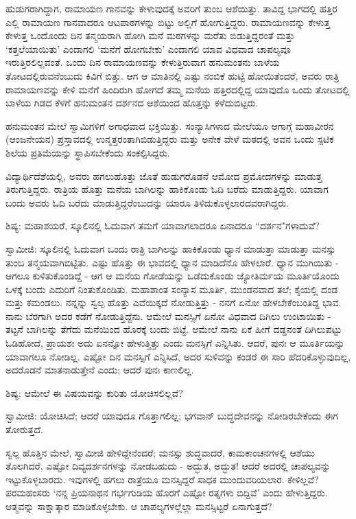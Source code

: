 ಹುಡುಗರಾಗಿದ್ದಾಗ, ರಾಮಾಯಣ ಗಾನವನ್ನು ಕೇಳುವುದಕ್ಕೆ ಅವರಿಗೆ ತುಂಬ ಆಶೆಯಿತ್ತು. ತಾವಿದ್ದ ಭಾಗದಲ್ಲಿ ಹತ್ತಿರ ಎಲ್ಲಿ ರಾಮಾಯಣ ಗಾನವಾದರೂ ಆಟಪಾಠಗಳನ್ನು ಬಿಟ್ಟು ಅಲ್ಲಿಗೆ ಹೋಗುತ್ತಿದ್ದರು. ರಾಮಾಯಣವನ್ನು ಕೇಳುತ್ತ ಕೇಳುತ್ತ ಒಂದೊಂದು ದಿನ ತನ್ಮಯರಾಗಿ ಹೋಗಿ ಮನೆ ಮಠಗಳನ್ನು ಮರೆತು ಬಿಡುತ್ತಿದ್ದರಂತೆ ಮತ್ತು ‘ಕತ್ತಲೆಯಾಯಿತು’ ಎಂದಾಗಲಿ ‘ಮನೆಗೆ ಹೋಗಬೇಕು’ ಎಂದಾಗಲಿ ಯಾವ ವಿಧವಾದ ಚಾಪಲ್ಯವೂ ಇರುತ್ತಿರಲಿಲ್ಲವಂತೆ. ಒಂದು ದಿನ ರಾಮಾಯಣವನ್ನು ಕೇಳುತ್ತಿರುವಾಗ ಹನುಮಂತನು ಬಾಳೆಯ ತೋಟದಲ್ಲಿರುವನೆಂಬುದು ಕಿವಿಗೆ ಬಿತ್ತು. ಆಗ ಆ ಮಾತಿನಲ್ಲಿ ಎಷ್ಟು ನಂಬಿಕೆ ಹುಟ್ಟಿ ಹೋಯಿತೆಂದರೆ, ಅವರು ರಾತ್ರಿ ರಾಮಾಯಣವನ್ನು ಕೇಳಿ ಮನೆಗೆ ಹಿಂದಿರುಗಿ ಹೋಗದೆ ತಮ್ಮ ಮನೆಯ ಹತ್ತಿರದಲ್ಲಿದ್ದ ಯಾವುದೊ ಒಂದು ತೋಟದಲ್ಲಿ ಬಾಳೆಯ ಗಿಡದ ಕೆಳಗೆ ಹನುಮಂತನ ದರ್ಶನದ ಆಶೆಯಿಂದ ಹೊತ್ತನ್ನು ಕಳೆದುಬಿಟ್ಟರು.

ಹನುಮಂತನ ಮೇಲೆ ಸ್ವಾಮಿಗಳಿಗೆ ಅಗಾಧವಾದ ಭಕ್ತಿಯಿತ್ತು. ಸಂನ್ಯಾಸಿಗಳಾದ ಮೇಲೆಯೂ ಆಗಾಗ್ಗೆ ಮಹಾವೀರನ (ಆಂಜನೇಯನ) ಪ್ರಸ್ತಾವದಲ್ಲಿ ಉನ್ಮತ್ತರಂತಾಗಿಬಿಡುತ್ತಿದ್ದರು ಮತ್ತು ಅನೇಕ ವೇಳೆ ಮಠದಲ್ಲಿ ಅವನ ಒಂದು ಸ್ಪಟಿಕ ಶಿಲೆಯ ಪ್ರತಿಮೆಯನ್ನು ಸ್ಥಾಪಿಸಬೇಕೆಂದು ಸಂಕಲ್ಪಿಸಿದ್ದರು.

ವಿದ್ಯಾರ್ಥಿದೆಶೆಯಲ್ಲಿ, ಅವರು ಹಗಲುಹೊತ್ತು ಜೊತೆ ಹುಡುಗರೊಡನೆ ಆಮೋದ ಪ್ರಮೋದಗಳನ್ನು ಮಾಡುತ್ತ ತಿರುಗುತ್ತಿದ್ದರು. ರಾತ್ರಿಯ ಹೊತ್ತು ಮನೆಯ ಬಾಗಿಲನ್ನು ಹಾಕಿಕೊಂಡು ಓದಿ ಬರೆದು ಮಾಡುತ್ತಿದ್ದರು. ಯಾವಾಗ ಬಂದು ಅವರು ಓದಿ ಬರೆದು ಮಾಡುತ್ತಿದ್ದರೆಂಬುದನ್ನು ಯಾರೂ ತಿಳಿದುಕೊಳ್ಳಲಾರದವರಾಗಿದ್ದರು.

\delimiter

ಶಿಷ್ಯ: ಮಹಾಶಯರೆ, ಸ್ಕೂಲಿನಲ್ಲಿ ಓದುವಾಗ ತಮಗೆ ಯಾವಾಗಲಾದರೂ ಏನಾದರೂ “ದರ್ಶನ"ಗಳಾದುವೆ?

ಸ್ವಾಮೀಜಿ: ಸ್ಕೂಲಿನಲ್ಲಿ ಓದುವಾಗ ಒಂದು ರಾತ್ರಿ ಬಾಗಿಲನ್ನು ಹಾಕಿಕೊಂಡು ಧ್ಯಾನ ಮಾಡುತ್ತಾ ಮಾಡುತ್ತಾ ಮನಸ್ಸು ತುಂಬ ತನ್ಮಯವಾಗಿಬಿಟ್ಟಿತು. ಎಷ್ಟು ಹೊತ್ತು ಈ ಭಾವದಲ್ಲಿ ಧ್ಯಾನ ಮಾಡಿದೆನೊ ಹೇಳಲಾರೆ. ಧ್ಯಾನ ಮುಗಿಯಿತು - ಆಗಲೂ ಕುಳಿತುಕೊಂಡಿದ್ದೆ - ಆಗ ಆ ಮನೆಯ ಗೋಡೆಯನ್ನು ಒಡೆದುಕೊಂಡು ಜ್ಯೋತಿರ್ಮಯ ಮೂರ್ತಿಯೊಂದು ಒಳಕ್ಕೆ ಬಂದು ಎದುರಿಗೆ ನಿಂತುಕೊಂಡಿತು. ಮಹಾಶಾಂತ ಸಂನ್ಯಾಸ ಮೂರ್ತಿ, ಮುಂಡನವಾದ ತಲೆ; ಕೈಯಲ್ಲಿ ದಂಡ ಮತ್ತು ಕಮಂಡಲು. ನನ್ನನ್ನು ಸ್ವಲ್ಪ ಹೊತ್ತು ಎವೆಯಿಕ್ಕದೆ ನೋಡುತ್ತಿತ್ತು - ನನಗೆ ಏನೋ ಹೇಳಬೇಕೆಂಬಂತಿದ್ದ ಭಾವ. ನಾನು ಬೆರಗಾಗಿ ಅದರ ಕಡೆಗೆ ನೋಡುತ್ತಿದ್ದೆನು. ಆಮೇಲೆ ಮನಸ್ಸಿಗೆ ಏನೋ ವಿಧವಾದ ದಿಗಿಲು ಉಂಟಾಯಿತು - ತಟ್ಟನೆ ಬಾಗಿಲನ್ನು ತೆಗೆದು ಮನೆಯಿಂದ ಹೊರಕ್ಕೆ ಬಂದು ಬಿಟ್ಟೆ. ಆಮೇಲೆ ನಾನು ಏಕೆ ಹೀಗೆ ದಡ್ಡನಂತೆ ದಿಗಿಲುಪಟ್ಟು ಓಡಿಹೋದೆ, ಪ್ರಾಯಶಃ ಅದು ಏನನ್ನೋ ಹೇಳುತ್ತಿತ್ತು ಎಂದು ಮನಸ್ಸಿಗೆ ಎನ್ನಿಸಿತು. ಆದರೆ, ಪುನಃ ಆ ಮೂರ್ತಿಯನ್ನು ಯಾವಾಗಲೂ ನೋಡಿಲ್ಲ. ಎಷ್ಟೋ ದಿನ ಮನಸ್ಸಿಗೆ ಎನ್ನಿಸಿದೆ, ಅದರ ಸುಳಿವನ್ನು ಕಂಡರೆ ಈ ಸಾರಿ ಹೆದರಿಕೊಳ್ಳುವುದಿಲ್ಲ, ಅದರೊಡನೆ ಮಾತನಾಡುತ್ತೇನೆ ಎಂದು; ಆದರೆ ಪುನಃ ಕಾಣಲಿಲ್ಲ.

ಶಿಷ್ಯ: ಆಮೇಲೆ ಈ ವಿಷಯವನ್ನು ಕುರಿತು ಯೋಚಿಸಲಿಲ್ಲವೆ?

ಸ್ವಾಮೀಜಿ: ಯೋಚಿಸಿದೆ; ಆದರೆ ಯಾವುದೂ ಗೊತ್ತಾಗಲಿಲ್ಲ; ಭಗವಾನ್ ಬುದ್ಧದೇವನನ್ನು ನೋಡಿರಬೇಕೆಂದು ಈಗ ತೋರುತ್ತದೆ.

ಸ್ವಲ್ಪ ಹೊತ್ತಿನ ಮೇಲೆ, ಸ್ವಾಮೀಜಿ ಹೇಳಿದ್ದೇನೆಂದರೆ; ಮನಸ್ಸು ಶುದ್ಧವಾದರೆ, ಕಾಮಕಾಂಚನಗಳಲ್ಲಿ ಆಶೆಯು ತೊಲಗಿದರೆ, ಎಷ್ಟೋ ದಿವ್ಯದರ್ಶನಗಳನ್ನು ನೋಡಬಹುದು - ಅದ್ಭುತ, ಅದ್ಭುತ! ಆದರೆ ಅದರಲ್ಲಿ ಚಾಪಲ್ಯವನ್ನು ಇಟ್ಟುಕೊಳ್ಳಬಾರದು. ಇವುಗಳಲ್ಲಿ ಹಗಲು ರಾತ್ರೆಯೂ ಮನಸ್ಸಿದ್ದರೆ ಸಾಧಕ ಮುಂದುವರಿಯಲಾರ. ಕೇಳಿಲ್ಲವೆ? ಪರಮಹಂಸರು ‘ನನ್ನ ಪ್ರಿಯನಾಥನ ಗರ್ಭಗುಡಿಯ ಹೊರಗೆ ಎಷ್ಟೋ ರತ್ನಗಳು ಬಿದ್ದಿವೆ’ ಎಂದು ಹೇಳುತ್ತಿದ್ದರು. ಆತ್ಮವನ್ನು ಸಾಕ್ಷಾತ್ಕಾರ ಮಾಡಿಕೊಳ್ಳಬೇಕು. ಆ ಚಾಪಲ್ಯಗಳಲ್ಲೆಲ್ಲಾ ಮನಸ್ಸಿಟ್ಟರೆ ಏನಾಗುತ್ತದೆ?

